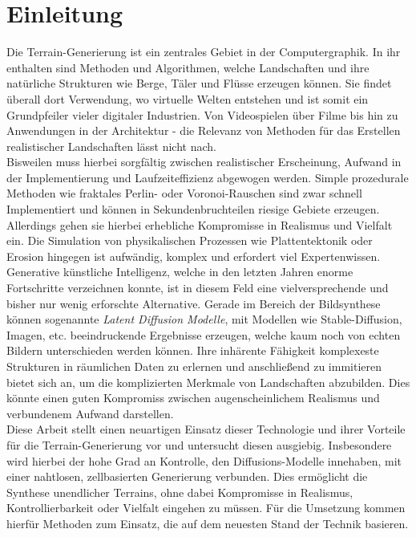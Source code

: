 \chapter{Einleitung}



Die Terrain-Generierung ist ein zentrales Gebiet in der Computergraphik. In ihr enthalten sind Methoden und Algorithmen, welche Landschaften und ihre natürliche Strukturen wie Berge, Täler und Flüsse erzeugen können. Sie findet überall dort Verwendung, wo virtuelle Welten entstehen und ist somit ein Grundpfeiler vieler digitaler Industrien. Von Videospielen über Filme bis hin zu Anwendungen in der Architektur - die Relevanz von Methoden für das Erstellen realistischer Landschaften lässt nicht nach. \\
Bisweilen muss hierbei sorgfältig zwischen realistischer Erscheinung, Aufwand in der Implementierung und Laufzeiteffizienz abgewogen werden. Simple prozedurale Methoden wie fraktales Perlin- oder Voronoi-Rauschen sind zwar schnell Implementiert und können in Sekundenbruchteilen riesige Gebiete erzeugen. Allerdings gehen sie hierbei erhebliche Kompromisse in Realismus und Vielfalt ein. Die Simulation von physikalischen Prozessen wie Plattentektonik oder Erosion hingegen ist aufwändig, komplex und erfordert viel Expertenwissen. \\
Generative künstliche Intelligenz, welche in den letzten Jahren enorme Fortschritte verzeichnen konnte, ist in diesem Feld eine vielversprechende und bisher nur wenig erforschte Alternative. Gerade im Bereich der Bildsynthese können sogenannte \textit{Latent Diffusion Modelle}, mit Modellen wie Stable-Diffusion, Imagen, etc. beeindruckende Ergebnisse erzeugen, welche kaum noch von echten Bildern unterschieden werden können.
Ihre inhärente Fähigkeit komplexeste Strukturen in räumlichen Daten zu erlernen und anschließend zu immitieren bietet sich an, um die komplizierten Merkmale von Landschaften abzubilden. Dies könnte einen guten Kompromiss zwischen augenscheinlichem Realismus und verbundenem Aufwand darstellen. \\
Diese Arbeit stellt einen neuartigen Einsatz dieser Technologie und ihrer Vorteile für die Terrain-Generierung vor und untersucht diesen ausgiebig. Insbesondere wird hierbei der hohe Grad an Kontrolle, den Diffusions-Modelle innehaben, mit einer nahtlosen, zellbasierten Generierung verbunden. Dies ermöglicht die Synthese unendlicher Terrains, ohne dabei Kompromisse in Realismus, Kontrollierbarkeit oder Vielfalt eingehen zu müssen. Für die Umsetzung kommen hierfür Methoden zum Einsatz, die auf dem neuesten Stand der Technik basieren.
 
